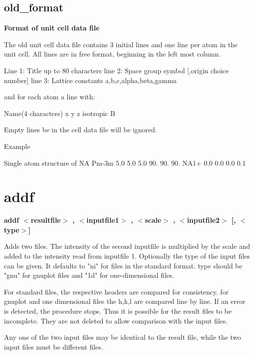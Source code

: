 \subsection*{old\_format}
{\bf Format of unit cell data file \par }
\par
\vspace{3pt}
The old unit cell data file contains 3 initial lines and one line per 
atom in the unit cell. All lines are in free format, beginning in 
the left most column. 
\par
\begin{MacVerbatim}
Line 1:   Title up to 80 characters
line 2:   Space group symbol [,origin choice number]
line 3:   Lattice constants a,b,c,alpha,beta,gamma
\end{MacVerbatim}
and for each atom a line with: 
\par
\begin{MacVerbatim}
          Name(4 characters) x  y  z  isotropic B
\end{MacVerbatim}
Empty lines be in the cell data file will be ignored. 
\par
Example 
\par
\begin{MacVerbatim}
Single atom structure of NA
Pm-3m
  5.0 5.0 5.0 90. 90. 90.
NA1+  0.0 0.0 0.0 0.1
\end{MacVerbatim}
\section{addf}
{\bf addf $ <$resultfile$> $ , $ <$inputfile1$> $ , $ <$scale$> $ , $ <$inputfile2$> $ [, $ <$type$> $] \par }
\par
\vspace{3pt}
Adds two files. The intensity of the second inputfile is multiplied 
by the scale and added to the intensity read from inputfile 1. 
Optionally the type of the input files can be given. It defaults 
to "ni" for files in the standard format. type should be "gnu" for 
gnuplot files and "1d" for one-dimensional files. 
\par
For standard files, the respective headers are compared for consistency. 
for gnuplot and one dimensional files the h,k,l are compared line by 
line. If an error is detected, the procedure stops. Thus it is possible 
for the result files to be incomplete. They are not deleted to allow 
comparison with the input files. 
\par
Any one of the two input files may be identical to the result file, 
while the two input files must be different files. 
